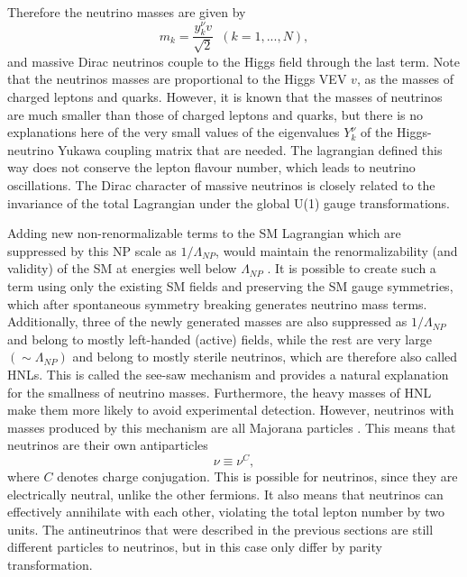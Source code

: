 Therefore the neutrino masses are given by
\begin{equation}
m_k=\frac{y_k^\nu v}{\sqrt{2}}\,\,\,\left(k=1,...,N\right),
\end{equation}
and massive Dirac neutrinos couple to the Higgs field through the last term. Note that the neutrinos masses are proportional to the Higgs VEV $v$, as the masses of charged leptons and quarks. However, it is known that the masses of neutrinos are much smaller than those of charged leptons and quarks, but there is no explanations here of the very small values of the eigenvalues $Y_k^{\nu}$ of the Higgs-neutrino Yukawa coupling matrix that are needed. The lagrangian defined this way does not conserve the lepton flavour number, which leads to neutrino oscillations. The Dirac character of massive neutrinos is closely related to the invariance of the total Lagrangian under the global U(1) gauge transformations.
\fi


Adding new non-renormalizable terms to the \gls{SM} Lagrangian which are suppressed by this \gls{NP} scale as $1/\Lambda_{NP}$, would maintain the renormalizability (and validity) of the \gls{SM} at energies well below $\Lambda_{NP}$ \cite{Gonzalez-GarciaPhenomenologyMassiveNu.pdf}. It is possible to create such a term using only the existing \gls{SM} fields and preserving the \gls{SM} gauge symmetries, which after spontaneous symmetry breaking generates neutrino mass terms. Additionally, three of the newly generated masses are also suppressed as $1/\Lambda_{NP}$ and belong to mostly left-handed (active) fields, while the rest are very large $\left(\sim\Lambda_{NP}\right)$ and belong to mostly sterile neutrinos, which are therefore also called \glspl{HNL}. This is called the see-saw mechanism \cite{SeeSawMechanism1979.pdf} and provides a natural explanation for the smallness of neutrino masses. Furthermore, the heavy masses of \gls{HNL} make them more likely to avoid experimental detection. However, neutrinos with masses produced by this mechanism are all Majorana particles \cite{MajoranaOriginalPaper.pdf}. This means that neutrinos are their own antiparticles
\begin{equation}
\nu\equiv\nu^C,
\end{equation}
where $C$ denotes charge conjugation. This is possible for neutrinos, since they are electrically neutral, unlike the other fermions. It also means that neutrinos can effectively annihilate with each other, violating the total lepton number by two units. The antineutrinos that were described in the previous sections are still different particles to neutrinos, but in this case only differ by parity transformation. 

